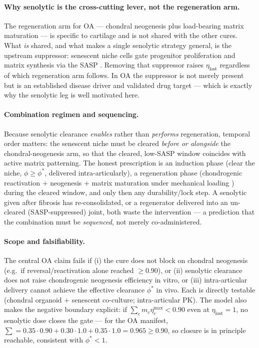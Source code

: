 \documentclass[11pt,a4paper]{article}
\begin{document}
\paragraph{Why senolytic is the cross-cutting lever, not the regeneration arm.} The
regeneration arm for OA --- chondral neogenesis plus load-bearing matrix maturation --- is
specific to cartilage and is not shared with the other cures. What \emph{is} shared, and
what makes a single senolytic strategy general, is the upstream suppressor: senescent
niche cells gate progenitor proliferation and matrix synthesis via the SASP
\citep{moiseeva2023,coryell2021}. Removing that suppressor raises $\eta_{\text{lost}}$
regardless of which regeneration arm follows. In OA the suppressor is not merely present
but is an established disease driver and validated drug target \citep{jeon2017,loeser2016}
--- which is exactly why the senolytic leg is well motivated here.

\paragraph{Combination regimen and sequencing.} Because senolytic clearance
\emph{enables} rather than \emph{performs} regeneration, temporal order matters: the
senescent niche must be cleared \emph{before or alongside} the chondral-neogenesis arm, so
that the cleared, low-SASP window coincides with active matrix patterning. The honest
prescription is an induction phase (clear the niche, $\phi\!\geq\!\phi^\ast$, delivered
intra-articularly), a regeneration phase (chondrogenic reactivation $+$ neogenesis $+$
matrix maturation under mechanical loading \citep{hodgkinson2022}) during the cleared
window, and only then any durability/lock step. A senolytic given after fibrosis has
re-consolidated, or a regenerator delivered into an un-cleared (SASP-suppressed) joint,
both waste the intervention --- a prediction that the combination must be
\emph{sequenced}, not merely co-administered.

\paragraph{Scope and falsifiability.} The central OA claim fails if (i) the cure does not
block on chondral neogenesis (e.g.\ if reversal/reactivation alone reached $\geq0.90$),
or (ii) senolytic clearance does not raise chondrogenic neogenesis efficiency in vitro, or
(iii) intra-articular delivery cannot achieve the effective clearance $\phi^\ast$ in vivo.
Each is directly testable (chondral organoid $+$ senescent co-culture; intra-articular PK).
The model also makes the negative boundary explicit: if $\sum_c m_c\eta_c^{\max}<0.90$ even
at $\eta_{\text{lost}}=1$, no senolytic dose closes the gate --- for the OA manifest,
$\sum=0.35\cdot0.90+0.30\cdot1.0+0.35\cdot1.0=0.965\geq0.90$, so closure is in principle
reachable, consistent with $\phi^\ast<1$.
\end{document}
